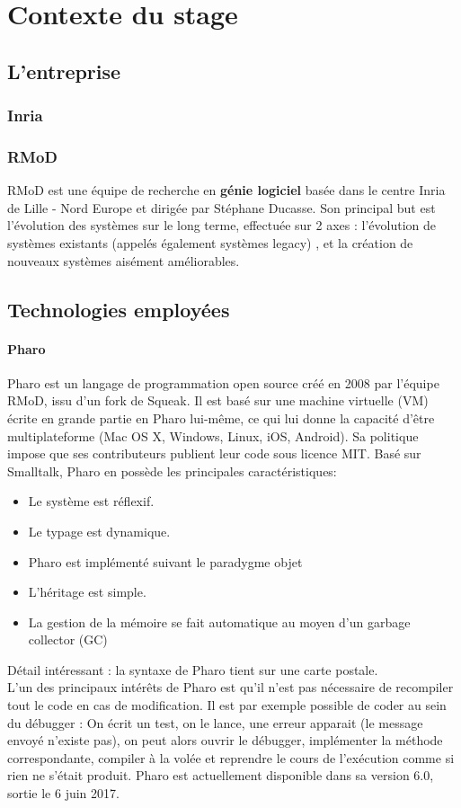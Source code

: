 	\section{Contexte du stage}
	\subsection{L'entreprise}
	\subsubsection{Inria}

	\subsubsection{RMoD}
	RMoD est une équipe de recherche en \textbf{génie logiciel} basée dans le centre Inria de Lille - Nord Europe et dirigée par Stéphane Ducasse. Son principal but est l'évolution des systèmes sur le long terme, effectuée sur 2 axes : l'évolution de systèmes existants (appelés également systèmes legacy) , et la création de nouveaux systèmes aisément améliorables.
	
	\subsection{Technologies employées}
	\paragraph{Pharo}
	Pharo est un langage de programmation open source créé en 2008 par l'équipe RMoD, issu d'un fork de Squeak. Il est basé sur une machine virtuelle (VM) écrite en grande partie en Pharo lui-même, ce qui lui donne la capacité d'être multiplateforme (Mac OS X, Windows, Linux, iOS, Android). Sa politique impose que ses contributeurs publient leur code sous licence MIT.
	Basé sur Smalltalk, Pharo en possède les principales caractéristiques:
	\begin{itemize}
		\item Le système est réflexif.
		\item Le typage est dynamique.
		\item Pharo est implémenté suivant le paradygme objet
		\item L'héritage est simple.
		\item La gestion de la mémoire se fait automatique au moyen d'un garbage collector (GC)
	\end{itemize}
	Détail intéressant : la syntaxe de Pharo tient sur une carte postale.\\
	L'un des principaux intérêts de Pharo est qu'il n'est pas nécessaire de recompiler tout le code en cas de modification. Il est par exemple possible de coder au sein du débugger : On écrit un test, on le lance, une erreur apparait (le message envoyé n'existe pas), on peut alors ouvrir le débugger, implémenter la méthode correspondante, compiler à la volée et reprendre le cours de l'exécution comme si rien ne s'était produit.
	Pharo est actuellement disponible dans sa version 6.0, sortie le 6 juin 2017.


